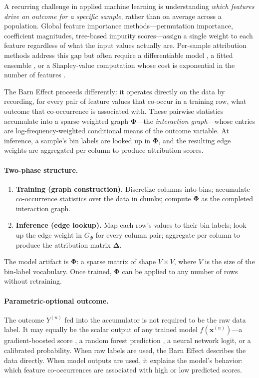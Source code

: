 \documentclass[11pt]{article}
\begin{document}
A recurring challenge in applied machine learning is understanding \emph{which features drive an outcome for a specific sample}, rather than on average across a population.
Global feature importance methods---permutation importance, coefficient magnitudes, tree-based impurity scores---assign a single weight to each feature regardless of what the input values actually are.
Per-sample attribution methods address this gap but often require a differentiable model \cite{Lundberg2017}, a fitted ensemble \cite{Breiman2001}, or a Shapley-value computation whose cost is exponential in the number of features \cite{Ribeiro2016}.

The Barn Effect proceeds differently: it operates directly on the data by recording, for every pair of feature values that co-occur in a training row, what outcome that co-occurrence is associated with.
These pairwise statistics accumulate into a sparse weighted graph $\bm{\Phi}$---the \emph{interaction graph}---whose entries are log-frequency-weighted conditional means of the outcome variable.
At inference, a sample's bin labels are looked up in $\bm{\Phi}$, and the resulting edge weights are aggregated per column to produce attribution scores.

\paragraph{Two-phase structure.}
\begin{enumerate}
  \item \textbf{Training (graph construction).}
    Discretize columns into bins; accumulate co-occurrence statistics over the data in chunks; compute $\bm{\Phi}$ as the completed interaction graph.
  \item \textbf{Inference (edge lookup).}
    Map each row's values to their bin labels; look up the edge weight in $G_\Phi$ for every column pair; aggregate per column to produce the attribution matrix $\bm{\Delta}$.
\end{enumerate}
The model artifact is $\bm{\Phi}$: a sparse matrix of shape $V \times V$, where $V$ is the size of the bin-label vocabulary.
Once trained, $\bm{\Phi}$ can be applied to any number of rows without retraining.

\paragraph{Parametric-optional outcome.}
The outcome $Y^{(n)}$ fed into the accumulator is not required to be the raw data label.
It may equally be the scalar output of any trained model $\hat{f}(\bm{x}^{(n)})$---a gradient-boosted score \cite{Chen2016}, a random forest prediction \cite{Breiman2001}, a neural network logit, or a calibrated probability.
When raw labels are used, the Barn Effect describes the data directly.
When model outputs are used, it explains the model's behavior: which feature co-occurrences are associated with high or low predicted scores.
\end{document}
